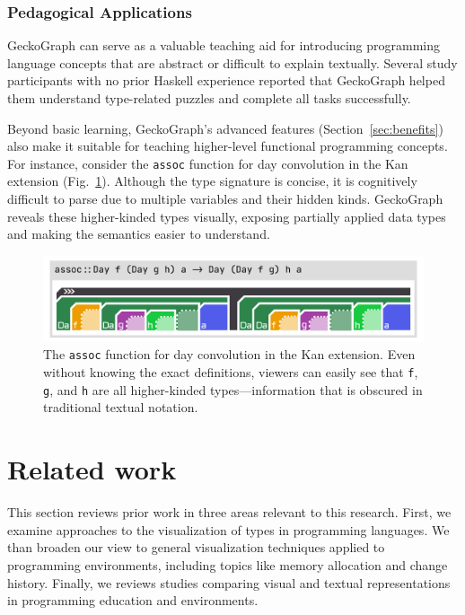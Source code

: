 \documentclass[preprint,12pt]{elsarticle}
\begin{document}
\subsubsection{Pedagogical Applications}
GeckoGraph can serve as a valuable teaching aid for introducing programming language concepts that are abstract or difficult to explain textually. 
Several study participants with no prior Haskell experience reported that GeckoGraph helped them understand type-related puzzles and complete all tasks successfully. 

Beyond basic learning, GeckoGraph’s advanced features (Section~\ref{sec:benefits}) also make it suitable for teaching higher-level functional programming concepts. 
For instance, consider the \texttt{assoc} function for day convolution \cite{Day1970-kb} in the Kan extension (Fig.~\ref{fig:assoc}). 
Although the type signature is concise, it is cognitively difficult to parse due to multiple variables and their hidden kinds. 
GeckoGraph reveals these higher-kinded types visually, exposing partially applied data types and making the semantics easier to understand.

\begin{figure}[]
  \includegraphics[width=\linewidth]{figures/assoc}
  \caption{\label{fig:assoc} 
  The \texttt{assoc} function for day convolution \cite{Day1970-kb} in the Kan extension. 
  Even without knowing the exact definitions, viewers can easily see that \texttt{f}, \texttt{g}, and \texttt{h} are all higher-kinded types—information that is obscured in traditional textual notation.}
\end{figure}


\section{Related work}
This section reviews prior work in three areas relevant to this research. First, we examine approaches to the visualization of types in programming languages. 
We than broaden our view to general visualization techniques applied to programming environments, including topics like memory allocation and change history.  Finally, we reviews studies comparing visual and textual representations in programming education and environments.
\end{document}
